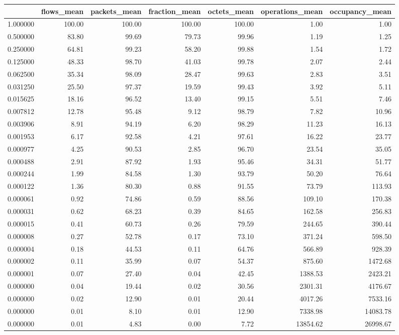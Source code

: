 \begin{tabular}{lrrrrrr}
\toprule
 & flows_mean & packets_mean & fraction_mean & octets_mean & operations_mean & occupancy_mean \\
\midrule
1.000000 & 100.00 & 100.00 & 100.00 & 100.00 & 1.00 & 1.00 \\
0.500000 & 83.80 & 99.69 & 79.73 & 99.96 & 1.19 & 1.25 \\
0.250000 & 64.81 & 99.23 & 58.20 & 99.88 & 1.54 & 1.72 \\
0.125000 & 48.33 & 98.70 & 41.03 & 99.78 & 2.07 & 2.44 \\
0.062500 & 35.34 & 98.09 & 28.47 & 99.63 & 2.83 & 3.51 \\
0.031250 & 25.50 & 97.37 & 19.59 & 99.43 & 3.92 & 5.11 \\
0.015625 & 18.16 & 96.52 & 13.40 & 99.15 & 5.51 & 7.46 \\
0.007812 & 12.78 & 95.48 & 9.12 & 98.79 & 7.82 & 10.96 \\
0.003906 & 8.91 & 94.19 & 6.20 & 98.29 & 11.23 & 16.13 \\
0.001953 & 6.17 & 92.58 & 4.21 & 97.61 & 16.22 & 23.77 \\
0.000977 & 4.25 & 90.53 & 2.85 & 96.70 & 23.54 & 35.05 \\
0.000488 & 2.91 & 87.92 & 1.93 & 95.46 & 34.31 & 51.77 \\
0.000244 & 1.99 & 84.58 & 1.30 & 93.79 & 50.20 & 76.64 \\
0.000122 & 1.36 & 80.30 & 0.88 & 91.55 & 73.79 & 113.93 \\
0.000061 & 0.92 & 74.86 & 0.59 & 88.56 & 109.10 & 170.38 \\
0.000031 & 0.62 & 68.23 & 0.39 & 84.65 & 162.58 & 256.83 \\
0.000015 & 0.41 & 60.73 & 0.26 & 79.59 & 244.65 & 390.44 \\
0.000008 & 0.27 & 52.78 & 0.17 & 73.10 & 371.24 & 598.50 \\
0.000004 & 0.18 & 44.53 & 0.11 & 64.76 & 566.89 & 928.39 \\
0.000002 & 0.11 & 35.99 & 0.07 & 54.37 & 875.60 & 1472.68 \\
0.000001 & 0.07 & 27.40 & 0.04 & 42.45 & 1388.53 & 2423.21 \\
0.000000 & 0.04 & 19.44 & 0.02 & 30.56 & 2301.31 & 4176.67 \\
0.000000 & 0.02 & 12.90 & 0.01 & 20.44 & 4017.26 & 7533.16 \\
0.000000 & 0.01 & 8.10 & 0.01 & 12.90 & 7338.98 & 14083.78 \\
0.000000 & 0.01 & 4.83 & 0.00 & 7.72 & 13854.62 & 26998.67 \\
\bottomrule
\end{tabular}
